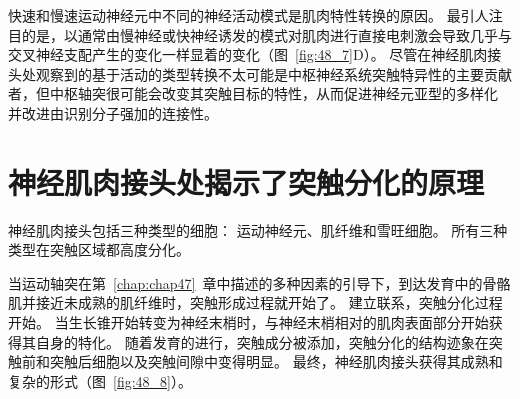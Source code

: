 快速和慢速运动神经元中不同的神经活动模式是肌肉特性转换的原因。
最引人注目的是，以通常由慢神经或快神经诱发的模式对肌肉进行直接电刺激会导致几乎与交叉神经支配产生的变化一样显着的变化（图~\ref{fig:48_7}D）。
尽管在神经肌肉接头处观察到的基于活动的类型转换不太可能是中枢神经系统突触特异性的主要贡献者，但中枢轴突很可能会改变其突触目标的特性，从而促进神经元亚型的多样化 并改进由识别分子强加的连接性。



\section{神经肌肉接头处揭示了突触分化的原理}

神经肌肉接头包括三种类型的细胞：
运动神经元、肌纤维和雪旺细胞。
所有三种类型在突触区域都高度分化。


当运动轴突在第~\ref{chap:chap47}~章中描述的多种因素的引导下，到达发育中的骨骼肌并接近未成熟的肌纤维时，突触形成过程就开始了。
建立联系，突触分化过程开始。
当生长锥开始转变为神经末梢时，与神经末梢相对的肌肉表面部分开始获得其自身的特化。
随着发育的进行，突触成分被添加，突触分化的结构迹象在突触前和突触后细胞以及突触间隙中变得明显。
最终，神经肌肉接头获得其成熟和复杂的形式（图~\ref{fig:48_8}）。


